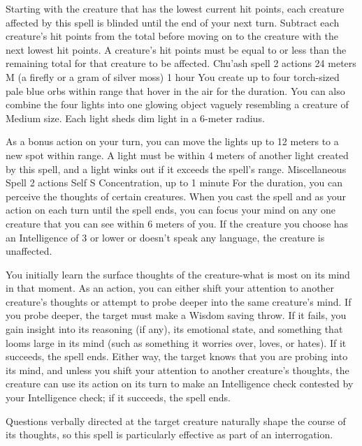    Starting with the creature that has the lowest current hit points, each creature affected by this spell is blinded until the end of your next turn.
    Subtract each creature's hit points from the total before moving on to the creature with the next lowest hit points.
    A creature's hit points must be equal to or less than the remaining total for that creature to be affected.
    {Chu'ash spell}
    {2 actions}
    {24 meters}
    {M (a firefly or a gram of silver moss)}
    {1 hour}
    You create up to four torch-sized pale blue orbs within range that hover in the air for the duration.
    You can also combine the four lights into one glowing object vaguely resembling a creature of Medium size.
    Each light sheds dim light in a 6-meter radius.

    As a bonus action on your turn, you can move the lights up to 12 meters to a new spot within range.
    A light must be within 4 meters of another light created by this spell, and a light winks out if it exceeds the spell's range.
    {Miscellaneous Spell}
    {2 actions}
    {Self}
    {S}
    {Concentration, up to 1 minute}
    For the duration, you can perceive the thoughts of certain creatures.
    When you cast the spell and as your action on each turn until the spell ends, you can focus your mind on any one creature that you can see within 6 meters of you.
    If the creature you choose has an Intelligence of 3 or lower or doesn't speak any language, the creature is unaffected.

    You initially learn the surface thoughts of the creature-what is most on its mind in that moment.
    As an action, you can either shift your attention to another creature's thoughts or attempt to probe deeper into the same creature's mind.
    If you probe deeper, the target must make a Wisdom saving throw.
    If it fails, you gain insight into its reasoning (if any), its emotional state, and something that looms large in its mind (such as something it worries over, loves, or hates).
    If it succeeds, the spell ends.
    Either way, the target knows that you are probing into its mind, and unless you shift your attention to another creature's thoughts, the creature can use its action on its turn to make an Intelligence check contested by your Intelligence check; if it succeeds, the spell ends.

    Questions verbally directed at the target creature naturally shape the course of its thoughts, so this spell is particularly effective as part of an interrogation.

